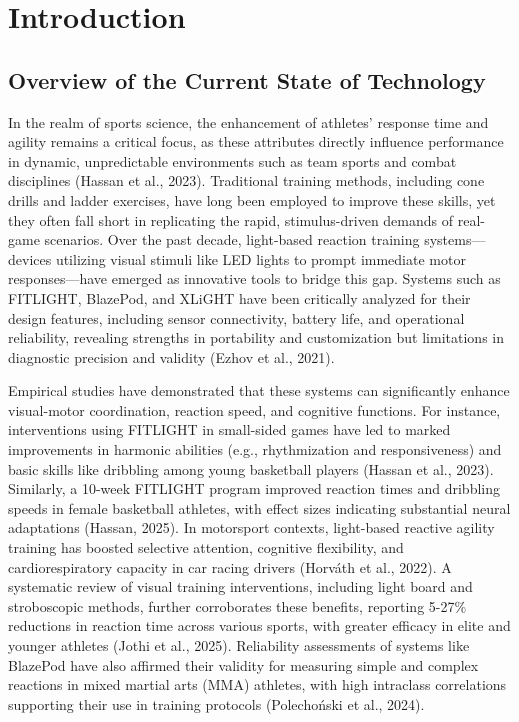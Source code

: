 \chapter{Introduction}
\label{sec:researchdesc}    %

\section{Overview of the Current State of Technology}
\label{sec:overview}

In the realm of sports science, the enhancement of athletes' response time and agility remains a critical focus, as these attributes directly influence performance in dynamic, unpredictable environments such as team sports and combat disciplines (Hassan et al., 2023). Traditional training methods, including cone drills and ladder exercises, have long been employed to improve these skills, yet they often fall short in replicating the rapid, stimulus-driven demands of real-game scenarios. Over the past decade, light-based reaction training systems—devices utilizing visual stimuli like LED lights to prompt immediate motor responses—have emerged as innovative tools to bridge this gap. Systems such as FITLIGHT, BlazePod, and XLiGHT have been critically analyzed for their design features, including sensor connectivity, battery life, and operational reliability, revealing strengths in portability and customization but limitations in diagnostic precision and validity (Ezhov et al., 2021).

Empirical studies have demonstrated that these systems can significantly enhance visual-motor coordination, reaction speed, and cognitive functions. For instance, interventions using FITLIGHT in small-sided games have led to marked improvements in harmonic abilities (e.g., rhythmization and responsiveness) and basic skills like dribbling among young basketball players (Hassan et al., 2023). Similarly, a 10-week FITLIGHT program improved reaction times and dribbling speeds in female basketball athletes, with effect sizes indicating substantial neural adaptations (Hassan, 2025). In motorsport contexts, light-based reactive agility training has boosted selective attention, cognitive flexibility, and cardiorespiratory capacity in car racing drivers (Horváth et al., 2022). A systematic review of visual training interventions, including light board and stroboscopic methods, further corroborates these benefits, reporting 5-27\% reductions in reaction time across various sports, with greater efficacy in elite and younger athletes (Jothi et al., 2025). Reliability assessments of systems like BlazePod have also affirmed their validity for measuring simple and complex reactions in mixed martial arts (MMA) athletes, with high intraclass correlations supporting their use in training protocols (Polechoński et al., 2024).

